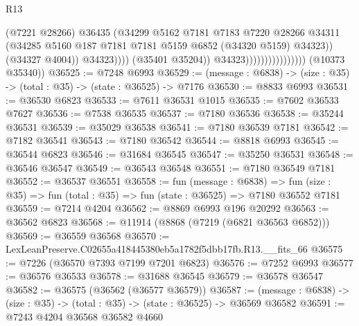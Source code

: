 \begin{lexlean}{R13}
\begin{coremodule}
                                                  (@7221 @28266)
                                                  @36435
                                                  (@34299
                                                    @5162
                                                    @7181
                                                    @7183
                                                    @7220
                                                    @28266
                                                    @34311
                                                    (@34285
                                                      @5160
                                                      @187
                                                      @7181
                                                      @7181
                                                      @5159
                                                      @6852
                                                      (@34320 @5159)
                                                      @34323))
                                                  (@34327 @4004))
                                                @34323))))
                                        (@35401 @35204))
                                      @34323))))))))))))))))
      (@10373 @35340))
@36525 := @7248 @6993
@36529 := (message : @6838) -> (size : @35) -> (total : @35) -> (state : @36525) -> @7176
@36530 := @8833 @6993
@36531 := @36530 @6823
@36533 := @7611 @36531 @1015
@36535 := @7602 @36533 @7627
@36536 := @7538 @36535
@36537 := @7180 @36536
@36538 := @35244 @36531
@36539 := @35029 @36538
@36541 := @7180 @36539 @7181
@36542 := @7182 @36541
@36543 := @7180 @36542
@36544 := @8818 @6993
@36545 := @36544 @6823
@36546 := @31684 @36545
@36547 := @35250 @36531
@36548 := @36546 @36547
@36549 := @36543 @36548
@36551 := @7180 @36549 @7181
@36552 := @36537 @36551
@36558 := fun (message : @6838) =>
  fun (size : @35) => fun (total : @35) => fun (state : @36525) => @7180 @36552 @7181
@36559 := @7214 @4204
@36562 := @8869 @6993 @196 @20292
@36563 := @36562 @6823
@36568 := @11914 (@8868 (@7219 (@6821 @36563 @6852)))
@36569 := @36559 @36568
@36570 := LexLeanPreserve.C02655a418445380eb5a1782f5dbb17fb.R13.__fits_66
@36575 := @7226 (@36570 @7393 @7199 @7201 @6823)
@36576 := @7252 @6993
@36577 := @36576 @36533
@36578 := @31688 @36545
@36579 := @36578 @36547
@36582 := @36575 (@36562 (@36577 @36579))
@36587 := (message : @6838) -> (size : @35) -> (total : @35) -> (state : @36525) -> @36569 @36582
@36591 := @7243 @4204 @36568 @36582 @4660

\end{coremodule}
\end{lexlean}
